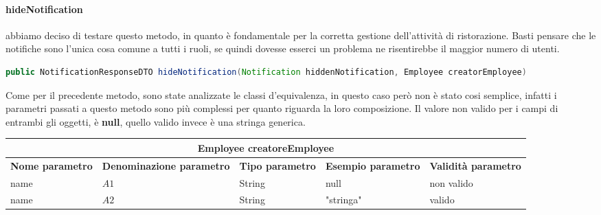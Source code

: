 \paragraph{hideNotification} abbiamo deciso di testare questo metodo, in quanto è fondamentale per la corretta gestione dell'attività di ristorazione. Basti pensare che le notifiche sono l'unica cosa comune a tutti i ruoli, se quindi dovesse esserci un problema ne risentirebbe il maggior numero di utenti.
\begin{lstlisting}[language=java]
  public NotificationResponseDTO hideNotification(Notification hiddenNotification, Employee creatorEmployee)
\end{lstlisting}
Come per il precedente metodo, sono state analizzate le classi d'equivalenza, in questo caso però non è stato cosi semplice, infatti i parametri passati a questo metodo sono più complessi per quanto riguarda la loro composizione.
Il valore non valido per i campi di entrambi gli oggetti, è \textbf{null}, quello valido invece è una stringa generica.
\begin{table}[H]
  \centering
  \begin{tabular}{|p{2cm}|p{3cm}|p{2cm}|p{2cm}|p{2cm}|}
    \hline
    \multicolumn{5}{|c|}{Employee creatoreEmployee}\\
    \hline
    \rowcolor{green!10}
    \textbf{Nome parametro} & \textbf{Denominazione parametro} & \textbf{Tipo parametro} & \textbf{Esempio parametro} & \textbf{Validità parametro} \\
    \hline
    \rowcolor{black!10}
    name                    & $A1$                             & String                  & null                       & non valido                  \\
    name                    & $A2$                             & String                  & "stringa"                  & valido                      \\
    \hline
  \end{tabular}
\end{table}

